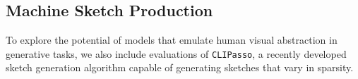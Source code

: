 \documentclass{article}
\begin{document}

\subsection{Machine Sketch Production}

To explore the potential of models that emulate human visual abstraction in generative tasks, we also include evaluations of \texttt{CLIPasso}, a recently developed sketch generation algorithm \cite{vinker2022clipasso} capable of generating sketches that vary in sparsity.
\end{document}
